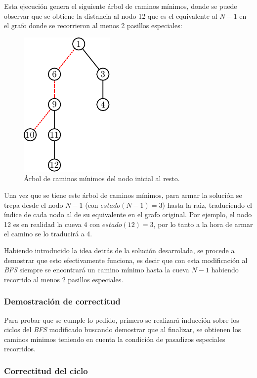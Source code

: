 	Esta ejecución genera el siguiente árbol de caminos mínimos, donde se puede
	observar que se obtiene la distancia al nodo 12 que es el equivalente al $N
	- 1$ en el grafo donde se recorrieron al menos 2 pasillos especiales:

	\begin{figure}[H]
		\centering
		\includegraphics{imagenes/ej1_modelo_3.pdf}
		\caption{Árbol de caminos mínimos del nodo inicial al resto.}
	\end{figure}

	Una vez que se tiene este árbol de caminos mínimos, para armar la solución se trepa
	desde el nodo $N - 1$ (con $estado(N - 1) = 3$) hasta la
	raiz, traduciendo el índice de cada nodo al de su equivalente en el grafo
	original. Por ejemplo, el nodo 12 es en realidad la cueva 4 con $estado(12) =
	3$, por lo tanto a la hora de armar el camino se lo traducirá a 4.

	Habiendo introducido la idea detrás de la solución desarrolada, se procede a
	demostrar que esto efectivamente funciona, es decir que con esta
	modificación al \emph{BFS} siempre se encontrará un camino mínimo hasta la
	cueva $N - 1$ habiendo recorrido al menos 2 pasillos especiales.

	\subsubsection{Demostración de correctitud}

	Para probar que se cumple lo pedido, primero se realizará inducción sobre los ciclos
	del \emph{BFS} modificado buscando demostrar que al finalizar, se obtienen
	los caminos mínimos teniendo en cuenta la condición de pasadizos especiales
	recorridos.

	\subsubsection*{Correctitud del ciclo}

